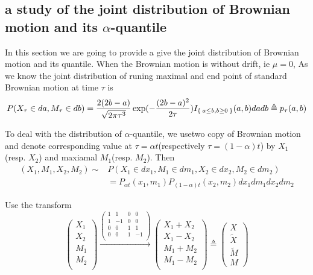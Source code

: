 \documentclass[11pt]{book}
\def\tX{{\widetilde{X}}}
\def\tM{{\widetilde{M}}}
\begin{document}
\subsection{a study of the joint distribution of Brownian motion and its $\alpha$-quantile}
In this section we are going to provide a give the joint distribution of Brownian motion and its quantile. When the Brownian motion is without drift,
ie $\mu = 0 $,
As we know the joint distribution of runing maximal and end point of
standard Brownian motion at time $\tau$ is
\[
P(X_\tau\in da, M_\tau\in db) =
\frac{2(2b-a)}{\sqrt{2\pi \tau^3}} \exp(-\frac{(2b-a)^2}{2\tau})
I_{\Set{a\leq b, b\geq 0}} (a,b) da db \triangleq p_\tau(a,b)
\]

To deal with the distribution of $\alpha$-quantile, we usetwo copy of
Brownian motion and denote corresponding value at
$\tau=\alpha t$(respectively $\tau=(1-\alpha) t$) by $X_1$(resp. $X_2$) and
maxiamal $M_1$(resp. $M_2$).
Then
\[
\begin{split}
(X_1,M_1, X_2, M_2) \sim& P(X_1\in dx_1, M_1\in dm_1, X_2\in dx_2, M_2\in dm_2)\\
&= P_{\alpha t}(x_1, m_1) P_{(1-\alpha)t}(x_2,m_2) dx_1dm_1dx_2dm_2
\end{split}
\]


Use the transform
\[
\begin{pmatrix}
X_1\\ X_2\\ M_1\\ M_2\\
\end{pmatrix}
\overset{
\begin{pmatrix}
1 & 1 & 0 &0 \\
1 & -1 & 0 & 0 \\
0 & 0 & 1 & 1\\
0 & 0 & 1 & -1\\
\end{pmatrix}
}{\longrightarrow}
\begin{pmatrix}
X_1+X_2\\
X_1 - X_2 \\
M_1 + M_2 \\
M_1 - M_2 \\
\end{pmatrix}
\triangleq
\begin{pmatrix}
X \\ \tX\\ \tM \\M
\end{pmatrix}
\]
\end{document}
